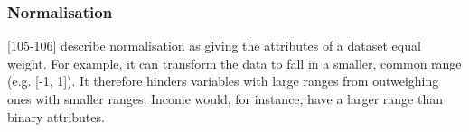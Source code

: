 
\subsubsection{Normalisation}
\label{section:Normalisation}



\textcite{han2011data}[105-106] describe normalisation as giving the attributes of a dataset equal weight. For example, it can transform the data to fall in a smaller, common range (e.g. [-1, 1]). It therefore hinders variables with large ranges from outweighing ones with smaller ranges. Income would, for instance, have a larger range than binary attributes. 

